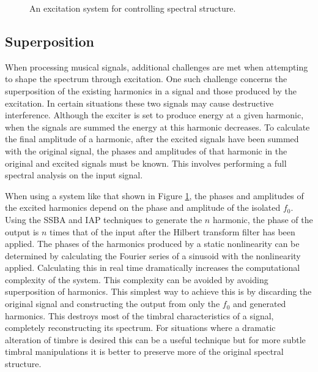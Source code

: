 \begin{figure}[h!]
			\caption{An excitation system for controlling spectral structure.}
			\label{fig:SpectralShapingSystem}
		\end{figure}

	\subsection{Superposition}
	\label{sec:FeatureControl-Systems-Superposition}
		When processing musical signals, additional challenges are met when attempting to shape the spectrum
		through excitation. One such challenge concerns the superposition of the existing harmonics in a signal and
		those produced by the excitation. In certain situations these two signals may cause destructive
		interference. Although the exciter is set to produce energy at a given harmonic, when the signals are
		summed the energy at this harmonic decreases. To calculate the final amplitude of a harmonic, after the
		excited signals have been summed with the original signal, the phases and amplitudes of that harmonic in
		the original and excited signals must be known. This involves performing a full spectral analysis on the
		input signal. 

		When using a system like that shown in Figure \ref{fig:SpectralShapingSystem}, the phases and amplitudes of
		the excited harmonics depend on the phase and amplitude of the isolated $f_{0}$. Using the SSBA and IAP
		techniques to generate the $n$ harmonic, the phase of the output is $n$ times that of the input
		after the Hilbert transform filter has been applied. The phases of the harmonics produced by a static
		nonlinearity can be determined by calculating the Fourier series of a sinusoid with the nonlinearity
		applied. Calculating this in real time dramatically increases the computational complexity of the system.
		This complexity can be avoided by avoiding superposition of harmonics. This simplest way to achieve this is
		by discarding the original signal and constructing the output from only the $f_{0}$ and generated
		harmonics.  This destroys most of the timbral characteristics of a signal, completely reconstructing its
		spectrum. For situations where a dramatic alteration of timbre is desired this can be a useful technique
		but for more subtle timbral manipulations it is better to preserve more of the original spectral structure.

